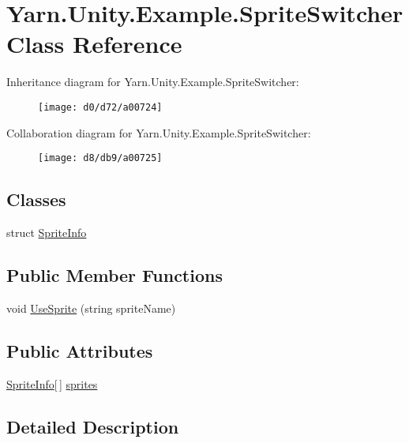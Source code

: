 \hypertarget{a00137}{\section{Yarn.\-Unity.\-Example.\-Sprite\-Switcher Class Reference}
\label{a00137}
}


Inheritance diagram for Yarn.\-Unity.\-Example.\-Sprite\-Switcher\-:
\nopagebreak
\begin{figure}[H]
\begin{center}
\leavevmode
\texttt{[image: d0/d72/a00724]}
\end{center}
\end{figure}


Collaboration diagram for Yarn.\-Unity.\-Example.\-Sprite\-Switcher\-:
\nopagebreak
\begin{figure}[H]
\begin{center}
\leavevmode
\texttt{[image: d8/db9/a00725]}
\end{center}
\end{figure}
\subsection*{Classes}
\begin{DoxyCompactItemize}
\item 
struct \hyperlink{a00137_dd/de2/a00320}{Sprite\-Info}
\end{DoxyCompactItemize}
\subsection*{Public Member Functions}
\begin{DoxyCompactItemize}
\item 
void \hyperlink{a00137_ac26718b713f342f3de8f3e569c5b62da}{Use\-Sprite} (string sprite\-Name)
\end{DoxyCompactItemize}
\subsection*{Public Attributes}
\begin{DoxyCompactItemize}
\item 
\hyperlink{a00137_dd/de2/a00320}{Sprite\-Info}\mbox{[}$\,$\mbox{]} \hyperlink{a00137_a1e85d9f4f6b33ca7ae638cce2eb704aa}{sprites}
\end{DoxyCompactItemize}


\subsection{Detailed Description}



